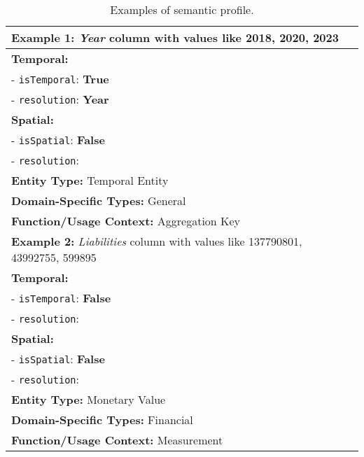 % 
\begin{table}[b]
    \small
    \centering
    \begin{tabular}{p{7.7cm}}
    \toprule
    \textbf{Example 1:} \textit{Year} column with values like 2018, 2020, 2023 \\
    \midrule
    \textbf{Temporal:} \\
    - \texttt{isTemporal}: \textbf{True} \\
    - \texttt{resolution}: \textbf{Year} \\
    
    \textbf{Spatial:} \\
    - \texttt{isSpatial}: \textbf{False} \\
    - \texttt{resolution}: \textbf{} \\
    
    \textbf{Entity Type:} Temporal Entity \\
    \textbf{Domain-Specific Types:} General \\
    \textbf{Function/Usage Context:} Aggregation Key \\
    \midrule
    \textbf{Example 2:} \textit{Liabilities} column with values like 137790801, 43992755, 599895 \\
    \midrule
    \textbf{Temporal:} \\
    - \texttt{isTemporal}: \textbf{False} \\
    - \texttt{resolution}: \textbf{} \\
    
    \textbf{Spatial:} \\
    - \texttt{isSpatial}: \textbf{False} \\
    - \texttt{resolution}: \textbf{} \\
    
    \textbf{Entity Type:} Monetary Value \\
    \textbf{Domain-Specific Types:} Financial \\
    \textbf{Function/Usage Context:} Measurement \\
    \bottomrule
    \end{tabular}
    \caption{Examples of semantic profile.}
    \label{tab:examples_year_premiumWritten}
    \vspace{-3.0em}
\end{table}
% 

